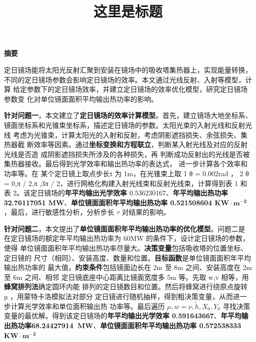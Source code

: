 \documentclass[zihao=-4, UTF8]{article}		%
\title{\textbf{这里是标题}}
\author{ }  %
\date{ }  %
\theoremstyle{MyLineTheoremStyle} %
\theoremstyle{MyBlockTheoremStyle} %
\theoremstyle{MySubsubsectionStyle} %
\newcommand{\cnabstractname}{\large 摘要}
\newenvironment{cnabstract}{%
        \par
        \noindent\mbox{}\hfill{\bfseries \cnabstractname}\hfill\mbox{}\par
        }{\par}
\begin{document}
 

\maketitle
\vspace{-80pt}

\begin{cnabstract}{\normalsize 

定日镜场能将太阳光反射汇聚到安装在镜场中的吸收塔集热器上，实现能量转换，
不同的定日镜场参数会影响定日镜场的效率。本文通过光线反射、入射等模型，计算
给定参数下的定日镜场效率，并建立定日镜场的效率优化模型，研究定日镜场参数变
化对单位镜面面积平均输出热功率的影响。 

\textbf{针对问题一}，本文建立了\textbf{定日镜场的效率计算模型}。首先，建立镜场大地坐标系、
镜面坐标系和光锥束坐标系，描述定日镜场的参数。太阳光束的入射光线和反射光线
考虑为光锥束，计算太阳光的入射和反射，考虑阴影遮挡损失、余弦损失、集热器截
断效率等因素。通过\textbf{坐标变换和方程联立}，判断某入射光线及对应的反射光线是否造
成阴影遮挡损失所涉及的各种损失，再
判断成功反射出的光线是否被集热器接收。最后得到光学效率和输出热功率的表达式，
进一步计算各个效率和功率等。在
某个定日镜上取点步长τ 为 1m，在光锥束上取 1 θ = 0.002rad ， 2 θ = 0,π / 2,π ,3π / 2，进行网格化构建入射光线束和反射光线束，计算得到表 1 和表 2。该定日镜场的\textbf{年平均输出光学效率 $0.536230167$}、\textbf{年平均输出热功率 32.76117051 $\mathbf{MW}$}、\textbf{单位镜面面积年平均输出热功率 0.521508604 $\mathbf{KW\cdot m^{-2}}$}，最后，进行敏感性分析，分析步长 $\tau$ 对结果的影响。 

\textbf{针对问题二}，本文提出了\textbf{单位镜面面积年平均输出热功率的优化模型}。问题二是
在定日镜场的额定年平均输出热功率为 60MW 的条件下，设计定日镜场的参数，使得
单位镜面面积年平均输出热功率尽量大。\textbf{决策变量}包括吸收塔的位置坐标、定日镜的
尺寸（相同）、安装高度、数量和位置。\textbf{目标函数}是单位镜面面积年平均输出热功率的
最大值，\textbf{约束条件}包括镜面边长在 2m 至 8m 之间、安装高度在 2m 至 6m 之间、相邻
定日镜底座中心距离比镜面宽度多 5m 等。先取 w,v 相等，用\textbf{蜂窝排列法}确定圆环内能
排列的定日镜数目和位置。然后将蜂窝进行绕原点旋转 µ ，用蒙特卡洛模拟法对部分
定日镜进行随机抽样，得到粗决策变量，从而进一步计算光学效率和单位面积输出热
功率等。最后遍历 $\mu, w = \nu, \tilde{h}, X_0, Y_0 $ 寻找决策变量的最优解。得到该定日镜场的\textbf{年平均输出光学效率 0.591643667}、\textbf{年平均输出热功率68.24427914 $\  \mathbf{MW}$}、\textbf{单位镜面面积年平均输出热功率  0.572538333 $  \mathbf{KW\cdot m^{-2}}$ }

}
\end{cnabstract}
\end{document}
